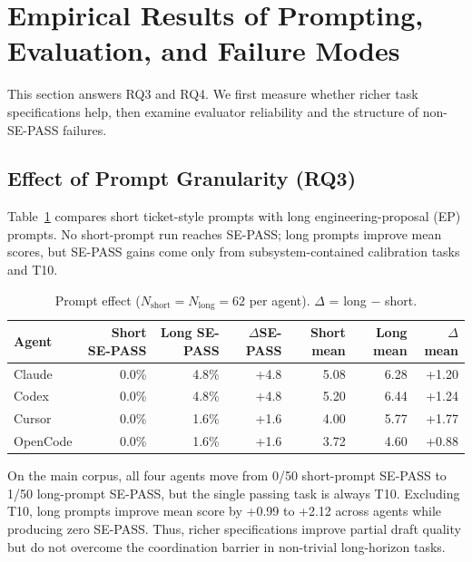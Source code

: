 \section{Empirical Results of Prompting, Evaluation, and Failure Modes}
\label{sec:prompting-failures}
\label{sec:root-cause}

This section answers RQ3 and RQ4. We first measure whether richer task specifications help, then examine evaluator reliability and the structure of non-SE-PASS failures.

\subsection{Effect of Prompt Granularity (RQ3)}
\label{sec:results-prompt}

Table~\ref{tab:prompt} compares short ticket-style prompts with long engineering-proposal (EP) prompts. No short-prompt run reaches SE-PASS; long prompts improve mean scores, but SE-PASS gains come only from subsystem-contained calibration tasks and T10.

\begin{table}[t]
\caption{Prompt effect ($N_{\mathrm{short}}{=}N_{\mathrm{long}}{=}62$ per agent). $\Delta$ = long $-$ short.}
\label{tab:prompt}
\centering
\small
\begin{tabular*}{\textwidth}{@{\extracolsep{\fill}}lrrrrrr@{}}
\toprule
\textbf{Agent} & \textbf{Short SE-PASS} & \textbf{Long SE-PASS} & \textbf{$\Delta$SE-PASS} & \textbf{Short mean} & \textbf{Long mean} & \textbf{$\Delta$mean} \\
\midrule
Claude   & 0.0\% & 4.8\% & +4.8 & 5.08 & 6.28 & +1.20 \\
Codex    & 0.0\% & 4.8\% & +4.8 & 5.20 & 6.44 & +1.24 \\
Cursor   & 0.0\% & 1.6\% & +1.6 & 4.00 & 5.77 & +1.77 \\
OpenCode & 0.0\% & 1.6\% & +1.6 & 3.72 & 4.60 & +0.88 \\
\bottomrule
\end{tabular*}
\end{table}

On the main corpus, all four agents move from 0/50 short-prompt SE-PASS to 1/50 long-prompt SE-PASS, but the single passing task is always T10. Excluding T10, long prompts improve mean score by +0.99 to +2.12 across agents while producing zero SE-PASS. Thus, richer specifications improve partial draft quality but do not overcome the coordination barrier in non-trivial long-horizon tasks.

